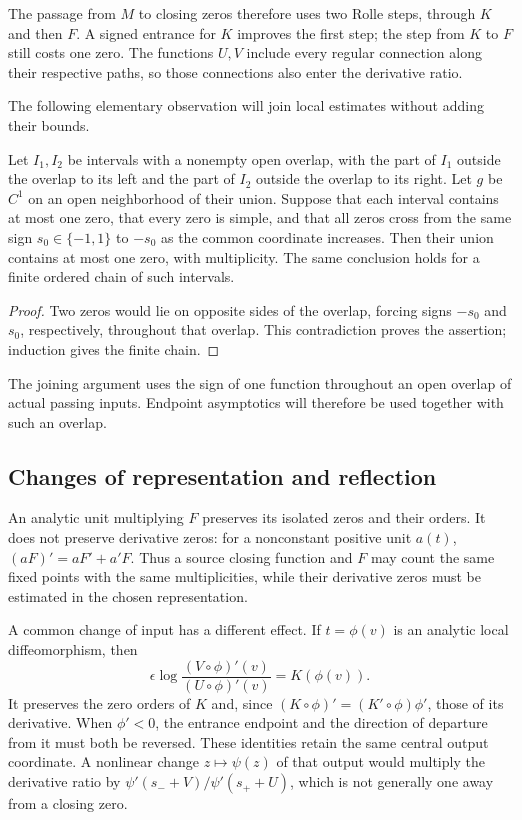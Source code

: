 The passage from $M$ to closing zeros therefore uses two Rolle steps,
through $K$ and then $F$.  A signed entrance for $K$ improves the first
step; the step from $K$ to $F$ still costs one zero.  The functions
$U,V$ include every regular connection along their respective paths,
so those connections also enter the derivative ratio.

The following elementary observation will join local estimates without
adding their bounds.

\begin{lemma}
\label{rw:counting:merge}
Let $I_1,I_2$ be intervals with a nonempty open overlap, with the part
of $I_1$ outside the overlap to its left and the part of $I_2$ outside
the overlap to its right.  Let $g$ be $C^1$ on an open neighborhood of
their union.  Suppose that each interval contains at most one zero,
that every zero is simple, and that all zeros cross from the same sign
$s_0\in\{-1,1\}$ to $-s_0$ as the common coordinate increases.
Then their union contains at most one zero, with multiplicity.  The
same conclusion holds for a finite ordered chain of such intervals.
\end{lemma}
\begin{proof}
Two zeros would lie on opposite sides of the overlap, forcing signs
\(-s_0\) and \(s_0\), respectively, throughout that overlap. This
contradiction proves the assertion; induction gives the finite chain.
\end{proof}

The joining argument uses the sign of one function throughout an open
overlap of actual passing inputs.  Endpoint asymptotics will therefore
be used together with such an overlap.

\subsection{Changes of representation and reflection}

An analytic unit multiplying $F$ preserves its isolated zeros and their
orders.  It does not preserve derivative zeros: for a nonconstant
positive unit $a(t)$, $(aF)'=aF'+a'F$.  Thus a source closing function
and $F$ may count the same fixed points with the same multiplicities,
while their derivative zeros must be estimated in the chosen
representation.

A common change of input has a different effect.  If $t=\phi(v)$ is
an analytic local diffeomorphism, then
\begin{equation}\label{rw:counting:input-change}
 \epsilon\log
 \frac{(V\circ\phi)'(v)}{(U\circ\phi)'(v)}
 =K(\phi(v)).
\end{equation}
It preserves the zero orders of $K$ and, since
$(K\circ\phi)'=(K'\circ\phi)\phi'$, those of its derivative.
When $\phi'<0$, the entrance endpoint and the direction of departure
from it must both be reversed.  These identities retain the same
central output coordinate.  A nonlinear change $z\mapsto\psi(z)$ of
that output would multiply the derivative ratio by
$\psi'(s_-+V)/\psi'(s_++U)$, which is not generally one away from a
closing zero.

